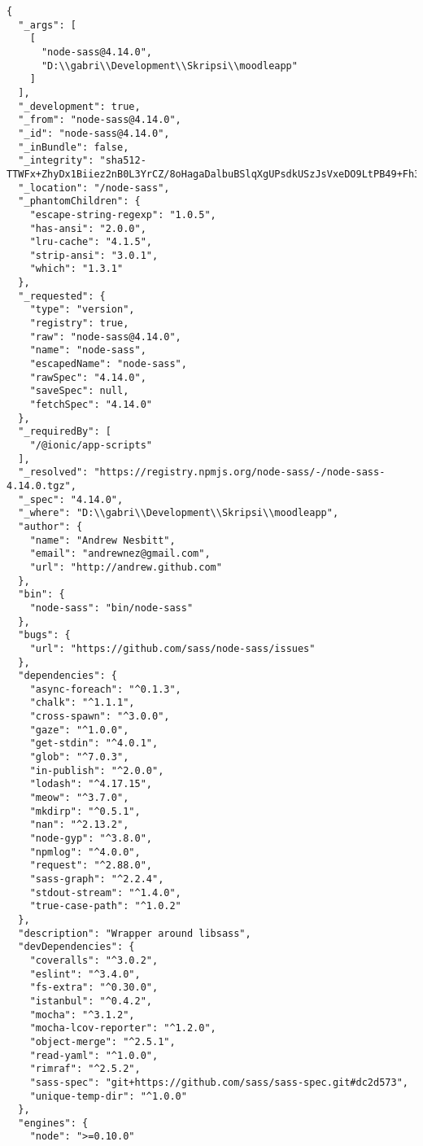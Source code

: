 \begin{lstlisting}[frame=single, label ={node:sass version}, caption = Perubahan versi node-sass pada \texttt{package-lock.json} ]
	{
  "_args": [
    [
      "node-sass@4.14.0",
      "D:\\gabri\\Development\\Skripsi\\moodleapp"
    ]
  ],
  "_development": true,
  "_from": "node-sass@4.14.0",
  "_id": "node-sass@4.14.0",
  "_inBundle": false,
  "_integrity": "sha512-TTWFx+ZhyDx1Biiez2nB0L3YrCZ/8oHagaDalbuBSlqXgUPsdkUSzJsVxeDO9LtPB49+Fh3WQl3slABo6AotNw==",
  "_location": "/node-sass",
  "_phantomChildren": {
    "escape-string-regexp": "1.0.5",
    "has-ansi": "2.0.0",
    "lru-cache": "4.1.5",
    "strip-ansi": "3.0.1",
    "which": "1.3.1"
  },
  "_requested": {
    "type": "version",
    "registry": true,
    "raw": "node-sass@4.14.0",
    "name": "node-sass",
    "escapedName": "node-sass",
    "rawSpec": "4.14.0",
    "saveSpec": null,
    "fetchSpec": "4.14.0"
  },
  "_requiredBy": [
    "/@ionic/app-scripts"
  ],
  "_resolved": "https://registry.npmjs.org/node-sass/-/node-sass-4.14.0.tgz",
  "_spec": "4.14.0",
  "_where": "D:\\gabri\\Development\\Skripsi\\moodleapp",
  "author": {
    "name": "Andrew Nesbitt",
    "email": "andrewnez@gmail.com",
    "url": "http://andrew.github.com"
  },
  "bin": {
    "node-sass": "bin/node-sass"
  },
  "bugs": {
    "url": "https://github.com/sass/node-sass/issues"
  },
  "dependencies": {
    "async-foreach": "^0.1.3",
    "chalk": "^1.1.1",
    "cross-spawn": "^3.0.0",
    "gaze": "^1.0.0",
    "get-stdin": "^4.0.1",
    "glob": "^7.0.3",
    "in-publish": "^2.0.0",
    "lodash": "^4.17.15",
    "meow": "^3.7.0",
    "mkdirp": "^0.5.1",
    "nan": "^2.13.2",
    "node-gyp": "^3.8.0",
    "npmlog": "^4.0.0",
    "request": "^2.88.0",
    "sass-graph": "^2.2.4",
    "stdout-stream": "^1.4.0",
    "true-case-path": "^1.0.2"
  },
  "description": "Wrapper around libsass",
  "devDependencies": {
    "coveralls": "^3.0.2",
    "eslint": "^3.4.0",
    "fs-extra": "^0.30.0",
    "istanbul": "^0.4.2",
    "mocha": "^3.1.2",
    "mocha-lcov-reporter": "^1.2.0",
    "object-merge": "^2.5.1",
    "read-yaml": "^1.0.0",
    "rimraf": "^2.5.2",
    "sass-spec": "git+https://github.com/sass/sass-spec.git#dc2d573",
    "unique-temp-dir": "^1.0.0"
  },
  "engines": {
    "node": ">=0.10.0"

\end{lstlisting}
